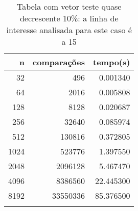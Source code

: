 \begin{table}[ht]
\centering
\begin{tabular}{rrr} \toprule
        n &    comparações &       tempo(s) \\ \midrule
      32  &            496 &      0.001340 \\
      64  &           2016 &      0.005808 \\
     128  &           8128 &      0.020687 \\
     256  &          32640 &      0.085974 \\
     512  &         130816 &      0.372805 \\
    1024  &         523776 &      1.397550 \\
    2048  &        2096128 &      5.467470 \\
    4096  &        8386560 &     22.445300 \\
    8192  &       33550336 &     85.376500 \\
\bottomrule\addlinespace
\end{tabular}
\caption{Tabela com vetor teste quase decrescente 10\%: a linha de interesse analisada para este caso é a 15}
\label{tab:bolhaQuaseDecresc10}
\end{table}
